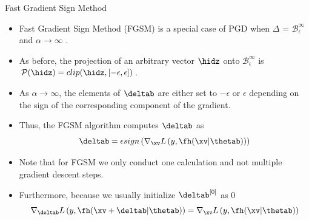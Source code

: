      \begin{vbframe} {Fast Gradient Sign Method}
   \begin{itemize}
   \item Fast Gradient Sign Method (FGSM) is a special case of PGD when $\Delta$ = $\mathcal{B}^{\infty}_{\epsilon}$ and $\alpha \rightarrow \infty$ . 
   \item As before, the projection of an arbitrary vector $\hidz$ onto $\mathcal{B}^{\infty}_{\epsilon}$ is $\mathcal{P}(\hidz) = clip(\hidz, [-\epsilon, \epsilon])$. 
   \item As $\alpha \rightarrow \infty$, the elements of $\deltab$ are either set to $-\epsilon$ or $\epsilon$ depending on the sign of the corresponding component of the gradient.
   \item Thus, the FGSM algorithm computes $\deltab$ as
   \small
    \begin{equation*}
      \deltab = \epsilon sign\left(\nabla_{\xv} L\left(y, \fh(\xv | \thetab) \right) \right)
    \end{equation*}
    \normalsize
    \item Note that for FGSM we only conduct one calculation and not multiple gradient descent steps.
    \item Furthermore, because we usually initialize $\deltab^{[0]}$ as $0$     
    \small
    $$\nabla_{\deltab} L\left(y, \fh(\xv + \deltab | \thetab) \right)  = \nabla_{\xv} L\left(y, \fh(\xv | \thetab) \right)$$
    \normalsize
  \begin{figure}
    \centering
      \captionsetup{font=footnotesize,labelfont=footnotesize, labelfont = bf}

\end{figure}
\end{itemize}
\end{vbframe}
